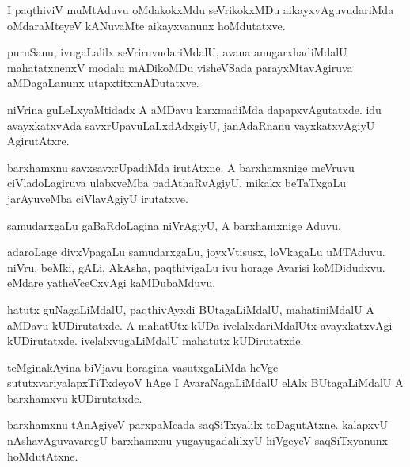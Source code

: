 \documentclass{article}
\begin{document}
\begin{mn}%
I paqthiviV muMtAduvu oMdakokxMdu seVrikokxMDu aikayxvAguvudariMda
oMdaraMteyeV kANuvaMte aikayxvanunx hoMdutatxve.
\end{mn}

\begin{mn}%
puruSanu, ivugaLalilx seVriruvudariMdalU, avana anugarxhadiMdalU
mahatatxnenxV modalu mADikoMDu visheVSada parayxMtavAgiruva
aMDagaLanunx utapxtitxmADutatxve.
\end{mn}

\begin{mn}%
niVrina guLeLxyaMtidadx A aMDavu karxmadiMda dapapxvAgutatxde. idu
avayxkatxvAda savxrUpavuLaLxdAdxgiyU, janAdaRnanu vayxkatxvAgiyU AgirutAtxre.
\end{mn}

\begin{mn}
barxhamxnu savxsavxrUpadiMda irutAtxne. A barxhamxnige meVruvu
ciVladoLagiruva ulabxveMba padAthaRvAgiyU, mikakx beTaTxgaLu
jarAyuveMba ciVlavAgiyU irutatxve.
\end{mn}

\begin{mn}
samudarxgaLu gaBaRdoLagina niVrAgiyU, A barxhamxnige Aduvu.
\end{mn}

\begin{mn}
adaroLage divxVpagaLu samudarxgaLu, joyxVtisusx, loVkagaLu
uMTAduvu. niVru, beMki, gALi, AkAsha, paqthivigaLu ivu horage Avarisi
koMDidudxvu. eMdare yatheVceCxvAgi kaMDubaMduvu.
\end{mn}

\begin{mn}%
hatutx guNagaLiMdalU, paqthivAyxdi BUtagaLiMdalU, mahatiniMdalU A
aMDavu kUDirutatxde. A mahatUtx kUDa ivelalxdariMdalUtx avayxkatxvAgi
kUDirutatxde. ivelalxvugaLiMdalU mahatutx kUDirutatxde.
\end{mn}

\begin{mn}
teMginakAyina biVjavu horagina vasutxgaLiMda heVge
sututxvariyalapxTiTxdeyoV hAge I AvaraNagaLiMdalU elAlx BUtagaLiMdalU
A barxhamxvu kUDirutatxde.
\end{mn}

\begin{mn}
barxhamxnu tAnAgiyeV parxpaMcada saqSiTxyalilx toDagutAtxne. kalapxvU
nAshavAguvavaregU barxhamxnu yugayugadalilxyU hiVgeyeV saqSiTxyanunx hoMdutAtxne.
\end{mn}
\end{document}
